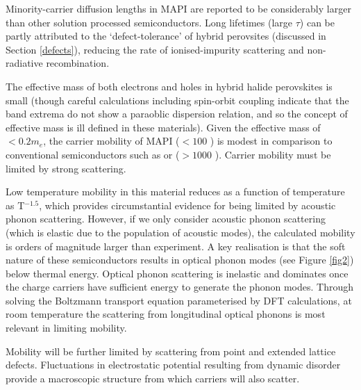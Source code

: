 Minority-carrier diffusion lengths in MAPI are reported to be considerably larger than other solution processed semiconductors.\autocite{Li2015zz}
%
Long lifetimes (large $\tau$) can be partly attributed to the `defect-tolerance' of hybrid perovsites (discussed in Section \ref{defects}), reducing the rate of ionised-impurity scattering and non-radiative recombination.  

The effective mass of both electrons and holes in hybrid halide perovskites is small (though careful calculations including spin-orbit coupling indicate that the band extrema do not show a paraoblic dispersion relation, and so the concept of effective mass is ill defined in these materials\autocite{Brivio2014a}).
Given the effective mass of $< 0.2 m_e$,  the carrier mobility of MAPI ($< 100$ \mob) is modest in comparison to conventional semiconductors such as  or  ($> 1000$ \mob).\autocite{Stranks2015b}
Carrier mobility must be limited by strong scattering.

Low temperature mobility in this material reduces as a function of temperature as T$^{-1.5}$, which provides circumstantial evidence for being limited by acoustic phonon scattering.\autocite{Karakus2015,Yi2016a}
However, if we only consider acoustic phonon scattering (which is elastic due to the population of acoustic modes), the calculated mobility is orders of magnitude larger than experiment. 
A key realisation is that the soft nature of these semiconductors results in optical phonon modes (see Figure \ref{fig2}) below thermal energy.\autocite{Brivio2015a,PerezOsorio2015a}
Optical phonon scattering is inelastic and dominates once the charge carriers have sufficient energy to generate the phonon modes\autocite{Leguy2016}. 
Through solving the Boltzmann transport equation parameterised by DFT calculations, at room temperature the scattering from longitudinal optical phonons is most relevant in limiting mobility.\autocite{Wright2016,Filippetti2016}

Mobility will be further limited by scattering from point and extended lattice defects.\autocite{Ball2016}
Fluctuations in electrostatic potential resulting from dynamic disorder provide a macroscopic structure from which carriers will also scatter.\autocite{Frost2014,Ma2014d}

